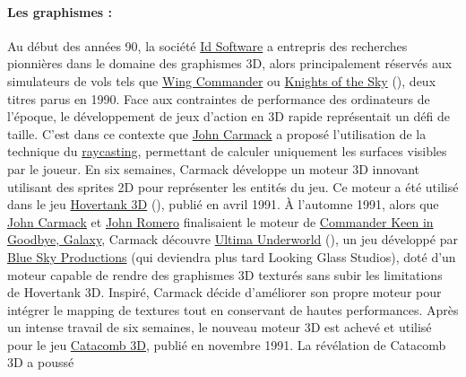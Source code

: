 \documentclass[11pt]{article}
\begin{document}
\paragraph{Les graphismes :}
Au début des années 90, la société \href{https://fr.wikipedia.org/wiki/Id_Software}{Id Software}\cite{Id_Software} a entrepris des 
recherches pionnières dans le domaine des graphismes 3D, alors principalement réservés aux simulateurs de vols tels 
que \href{https://fr.wikipedia.org/wiki/Wing_Commander_(jeu_vid%C3%A9o)}{Wing Commander}\cite{Wing_Commander} ou 
\href{https://en.wikipedia.org/wiki/Knights_of_the_Sky}{Knights of the Sky}\cite{Knights_of_the_Sky} (), deux titres parus en 1990. Face aux 
contraintes de performance des ordinateurs de l'époque, le développement de jeux d'action en 3D rapide représentait 
un défi de taille. C'est dans ce contexte que \href{https://fr.wikipedia.org/wiki/John_Carmack}{John Carmack}\cite{John_Carmack} a 
proposé l'utilisation de la technique du \href{https://fr.wikipedia.org/wiki/Raycasting}{raycasting}\cite{Raycasting}, permettant 
de calculer uniquement les surfaces visibles par le joueur. En six semaines, Carmack développe un moteur 3D innovant 
utilisant des sprites 2D pour représenter les entités du jeu. Ce moteur a été utilisé dans le jeu 
\href{https://fr.wikipedia.org/wiki/Hovertank_3D}{Hovertank 3D}\cite{Hovertank3D} (), publié en avril 1991.
À l'automne 1991, alors que \href{https://fr.wikipedia.org/wiki/John_Carmack}{John Carmack}\cite{John_Carmack} et 
\href{https://fr.wikipedia.org/wiki/John_Romero}{John Romero}\cite{John_Romero} finalisaient le moteur de 
\href{https://en.wikipedia.org/wiki/Commander_Keen_in_Goodbye,_Galaxy}{Commander Keen in Goodbye, Galaxy}\cite{Commander_Keen_in_Goodbye_Galaxy}, Carmack 
découvre \href{https://fr.wikipedia.org/wiki/Ultima_Underworld}{Ultima Underworld}\cite{Ultima_Underworld} (), un jeu développé par 
\href{https://fr.wikipedia.org/wiki/Looking_Glass_Studios}{Blue Sky Productions}\cite{Looking_Glass_Studios} (qui deviendra plus tard Looking Glass Studios), 
doté d'un moteur capable de rendre des graphismes 3D texturés sans subir les limitations de Hovertank 3D.
Inspiré, Carmack décide d'améliorer son propre moteur pour 
intégrer le mapping de textures tout en conservant de hautes performances. Après un intense travail de six semaines, 
le nouveau moteur 3D est achevé et utilisé pour le jeu \href{https://fr.wikipedia.org/wiki/Catacomb_3D}{Catacomb 3D}\cite{Catacomb3D},
publié en novembre 1991. La révélation de Catacomb 3D a poussé 
\end{document}

